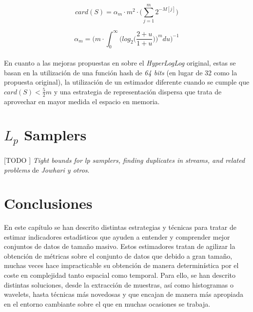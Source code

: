 \documentclass{subfiles}
\begin{document}
      \begin{equation}
      \label{eq:hyper_log_log_estimation}
        card(S) = \alpha_m \cdot m^2 \cdot \bigg( \sum_{j=1}^{m}2^{-M[j]}\bigg)
      \end{equation}

      \begin{equation}
      \label{eq:hyper_log_log_alpha}
        \alpha_m = \bigg(m \cdot \int_0^\infty \bigg(log_2\bigg(\frac{2+u}{1+u}\bigg)\bigg)^m du\bigg)^{-1}
      \end{equation}

      \paragraph{}
      En cuanto a las mejoras propuestas en \cite{heule2013hyperloglog} sobre el \emph{HyperLogLog} original, estas se basan en la utilización de una función hash de \emph{64 bits} (en lugar de 32 como la propuesta original), la utilización de un estimador diferente cuando se cumple que $card(S) < \frac{5}{2}m$ y una estrategia de representación dispersa que trata de aprovechar en mayor medida el espacio en memoria.

    \section{$L_p$ Samplers}
    \label{sec:lp_samplers}

      \paragraph{}
      [TODO ] \emph{Tight bounds for lp samplers, finding duplicates in streams, and related problems} \cite{jowhari2011tight} de \emph{Jowhari y otros}. 

    \section{Conclusiones}
    \label{sec:summaries_conclusions}

      \paragraph{}
      En este capítulo se han descrito distintas estrategias y técnicas para tratar de estimar indicadores estadísticos que ayuden a entender y comprender mejor conjuntos de datos de tamaño masivo. Estos estimadores tratan de agilizar la obtención de métricas sobre el conjunto de datos que debido a gran tamaño, muchas veces hace impracticable su obtención de manera determinística por el coste en complejidad tanto espacial como temporal. Para ello, se han descrito distintas soluciones, desde la extracción de muestras, así como histogramas o wavelets, hasta técnicas más novedosas y que encajan de manera más apropiada en el entorno cambiante sobre el que en muchas ocasiones se trabaja.
\end{document}
